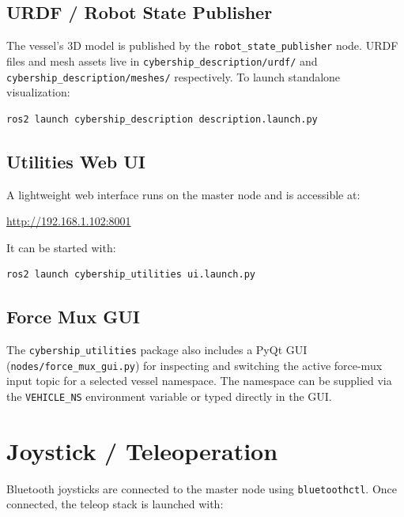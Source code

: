 \documentclass[12pt,a4paper]{article}
\begin{document}
	\subsection{URDF / Robot State Publisher}
	
	The vessel's 3D model is published by the \texttt{robot\_state\_publisher} node. URDF files
	and mesh assets live in \texttt{cybership\_description/urdf/} and
	\texttt{cybership\_description/meshes/} respectively. To launch standalone visualization:
	
	\begin{lstlisting}[style=bash]
		ros2 launch cybership_description description.launch.py
	\end{lstlisting}
	
	\subsection{Utilities Web UI}
	
	A lightweight web interface runs on the master node and is accessible at:
	
	\begin{center}
		\url{http://192.168.1.102:8001}
	\end{center}
	
	It can be started with:
	
	\begin{lstlisting}[style=bash]
		ros2 launch cybership_utilities ui.launch.py
	\end{lstlisting}
	
	\subsection{Force Mux GUI}
	
	The \texttt{cybership\_utilities} package also includes a PyQt GUI
	(\texttt{nodes/force\_mux\_gui.py}) for inspecting and switching the active force-mux input
	topic for a selected vessel namespace. The namespace can be supplied via the
	\texttt{VEHICLE\_NS} environment variable or typed directly in the GUI.
	
	\section{Joystick / Teleoperation}
	\label{sec:teleop}
	
	Bluetooth joysticks are connected to the master node using \texttt{bluetoothctl}. Once
	connected, the teleop stack is launched with:
	
\end{document}

